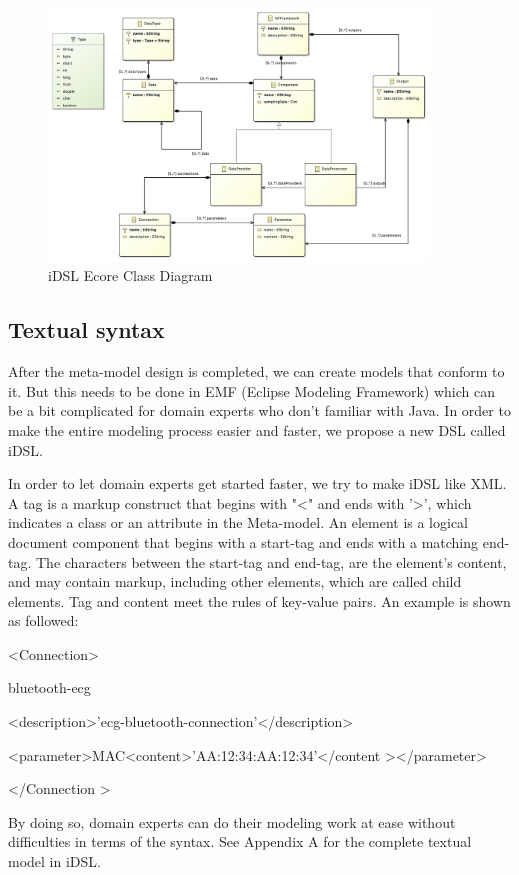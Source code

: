 \documentclass[11pt, oneside]{article}   	%
\begin{document}
\begin{figure}[htbp] 
\centering 
\includegraphics[width=0.9\textwidth]{iDSL class diagram.jpg} 
\caption{iDSL Ecore Class Diagram} 
\label{Fig.main1} 
\end{figure}

\subsection{Textual syntax}
\indent \par After the meta-model design is completed, we can create models that conform to it. But this needs to be done in EMF (Eclipse Modeling Framework) which can be a bit complicated for domain experts who don't familiar with Java. In order to make the entire modeling process easier and faster, we propose a new DSL called iDSL.\\
\indent \par In order to let domain experts get started faster, we try to make iDSL like XML. A tag is a markup construct that begins with "\textless" and ends with '\textgreater', which indicates a class or an attribute in the Meta-model. An element is a logical document component that begins with a start-tag and ends with a matching end-tag. The characters between the start-tag and end-tag, are the element's content, and may contain markup, including other elements, which are called child elements. Tag and content meet the rules of key-value pairs. An example is shown as followed:\par 
\indent \par
\textless Connection\textgreater \par
			\indent \indent bluetooth-ecg \par
			\indent \indent \textless description\textgreater'ecg-bluetooth-connection'\textless/description\textgreater \par
			\indent \indent \textless parameter\textgreater MAC\textless content\textgreater'AA:12:34:AA:12:34'\textless/content \textgreater \textless/parameter\textgreater \par
\textless/Connection \textgreater \par
\indent \par By doing so, domain experts can do their modeling work at ease without difficulties in terms of the syntax. See Appendix A for the complete textual model in iDSL.
\end{document}
